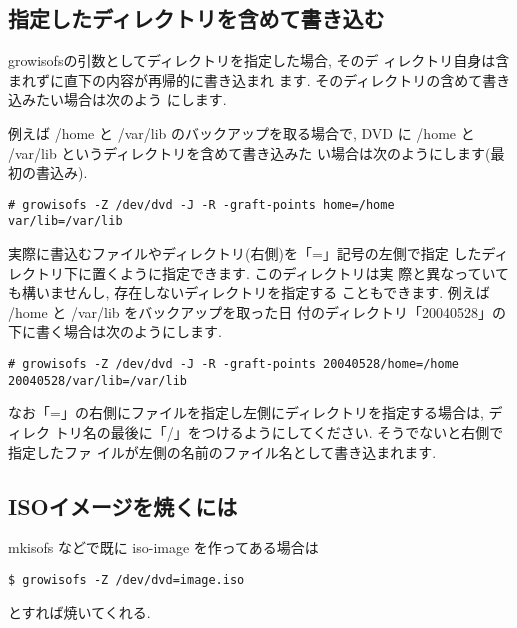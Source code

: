 \documentclass{jarticle}
\begin{document}
\subsection{指定したディレクトリを含めて書き込む}

growisofsの引数としてディレクトリを指定した場合, そのデ
ィレクトリ自身は含まれずに直下の内容が再帰的に書き込まれ
ます. そのディレクトリの含めて書き込みたい場合は次のよう
にします.

例えば /home と /var/lib のバックアップを取る場合で, DVD
に /home と /var/lib というディレクトリを含めて書き込みた
い場合は次のようにします(最初の書込み).

\begin{verbatim}
# growisofs -Z /dev/dvd -J -R -graft-points home=/home var/lib=/var/lib
\end{verbatim}
実際に書込むファイルやディレクトリ(右側)を「=」記号の左側で指定
したディレクトリ下に置くように指定できます. このディレクトリは実
際と異なっていても構いませんし, 存在しないディレクトリを指定する
こともできます. 例えば /home と /var/lib をバックアップを取った日
付のディレクトリ「20040528」の下に書く場合は次のようにします.

\begin{verbatim}
# growisofs -Z /dev/dvd -J -R -graft-points 20040528/home=/home 20040528/var/lib=/var/lib
\end{verbatim}
なお「=」の右側にファイルを指定し左側にディレクトリを指定する場合は, ディレク
トリ名の最後に「/」をつけるようにしてください. そうでないと右側で指定したファ
イルが左側の名前のファイル名として書き込まれます.

\subsection{ISOイメージを焼くには}
mkisofs などで既に iso-image を作ってある場合は

\begin{verbatim}
$ growisofs -Z /dev/dvd=image.iso
\end{verbatim}
とすれば焼いてくれる.
\end{document}
